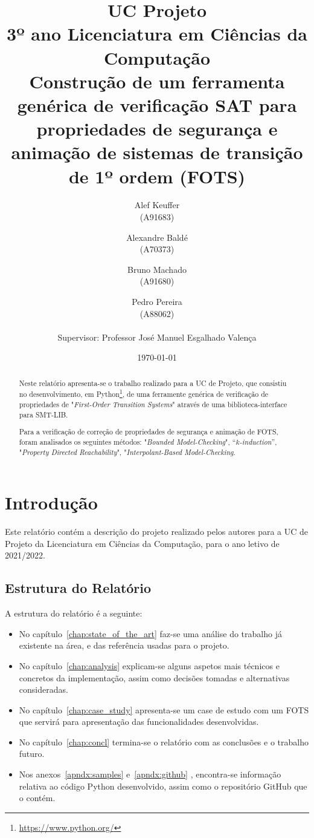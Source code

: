 \documentclass[11pt,a4paper]{report}%
\title{UC Projeto\\
      3º ano Licenciatura em Ciências da Computação \\
      Construção de um ferramenta genérica de verificação SAT para propriedades de segurança
e animação de sistemas de transição de 1º ordem (FOTS)
      } %
\author{Alef Keuffer\\ (A91683) \and Alexandre Baldé\\ (A70373)
         \and Bruno Machado\\ (A91680) \and Pedro Pereira\\ (A88062) \\ \\
        Supervisor: Professor José Manuel Esgalhado Valença
       } %
\date{\today} %
\def\pdr{"\textit{Property Directed Reachability}"\xspace}
\def\bmc{"\textit{Bounded Model-Checking}"\xspace}
\def\imc{"\textit{Interpolant-Based Model-Checking}\xspace}
\def\fots{"\textit{First-Order Transition Systems}"\xspace}
\def\kind{``\textit{$k$-induction}''\xspace}
\begin{document}
\maketitle %

\begin{abstract}  %
Neste relatório apresenta-se o trabalho realizado para a UC de Projeto, que
consistiu no desenvolvimento, em Python\footnote{\url{https://www.python.org/}}, de uma ferramente genérica de verificação de
propriedades de \fots através de uma biblioteca-interface para SMT-LIB.

Para a verificação de correção de propriedades de segurança e animação de FOTS,
foram analisados os seguintes métodos: \bmc, \kind, \pdr, \imc.
\end{abstract}

\tableofcontents %
\listoffigures %

\chapter{Introdução} \label{chap:intro} %

Este relatório contém a descrição do projeto realizado pelos autores para a
UC de Projeto da Licenciatura em Ciências da Computação, para o ano letivo de 2021/2022.

\section{Estrutura do Relatório}

A estrutura do relatório é a seguinte:
\begin{itemize}
\item No capítulo~\ref{chap:state_of_the_art} faz-se uma análise do trabalho
  já existente na área, e das referência usadas para o projeto.

\item No capítulo~\ref{chap:analysis} explicam-se alguns aspetos mais técnicos e concretos
da implementação, assim como decisões tomadas e alternativas consideradas.

\item No capítulo~\ref{chap:case_study} apresenta-se um case de estudo com um FOTS que servirá para
apresentação das funcionalidades desenvolvidas.

\item No capítulo~\ref{chap:concl} termina-se o relatório com as conclusões e o trabalho futuro.

\item Nos anexos~\ref{apndx:samples} e~\ref{apndx:github} , encontra-se informação relativa ao código
Python desenvolvido, assim como o repositório GitHub que o contém.

\end{itemize}
\end{document}
